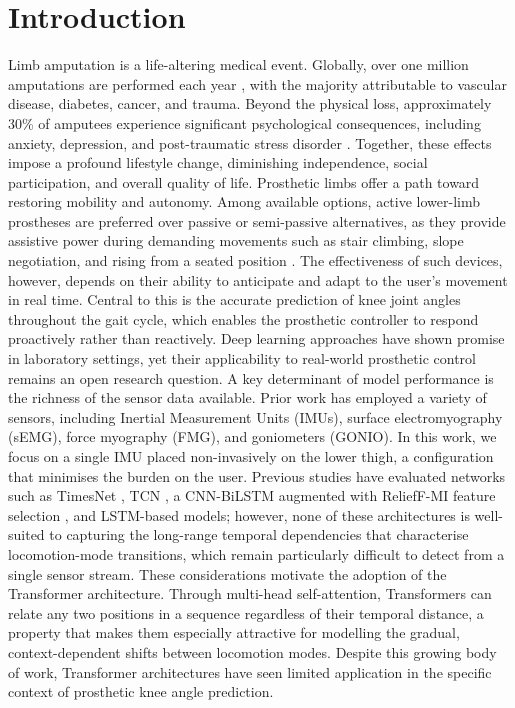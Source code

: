 \section{Introduction}\label{sec:introduction}

Limb amputation is a life-altering medical event. Globally, over one million amputations are performed each year \citep{wen2023globaltamputation}, with the majority attributable to vascular disease, diabetes, cancer, and trauma. Beyond the physical loss, approximately 30\% of amputees experience significant psychological consequences, including anxiety, depression, and post-traumatic stress disorder \citep{rojeDapic2021psychological}. Together, these effects impose a profound lifestyle change, diminishing independence, social participation, and overall quality of life.
Prosthetic limbs offer a path toward restoring mobility and autonomy. Among available options, active lower-limb prostheses are preferred over passive or semi-passive alternatives, as they provide assistive power during demanding movements such as stair climbing, slope negotiation, and rising from a seated position \citep{bhakta2023control}. The effectiveness of such devices, however, depends on their ability to anticipate and adapt to the user's movement in real time. Central to this is the accurate prediction of knee joint angles throughout the gait cycle, which enables the prosthetic controller to respond proactively rather than reactively.
Deep learning approaches have shown promise in laboratory settings, yet their applicability to real-world prosthetic control remains an open research question. A key determinant of model performance is the richness of the sensor data available. Prior work has employed a variety of sensors, including Inertial Measurement Units (IMUs), surface electromyography (sEMG), force myography (FMG), and goniometers (GONIO). In this work, we focus on a single IMU placed non-invasively on the lower thigh, a configuration that minimises the burden on the user. Previous studies have evaluated networks such as TimesNet \citep{PLACEHOLDER}, TCN \citep{PLACEHOLDER}, a CNN-BiLSTM augmented with ReliefF-MI feature selection \citep{PLACEHOLDER}, and LSTM-based models; however, none of these architectures is well-suited to capturing the long-range temporal dependencies that characterise locomotion-mode transitions, which remain particularly difficult to detect from a single sensor stream. These considerations motivate the adoption of the Transformer architecture. Through multi-head self-attention, Transformers can relate any two positions in a sequence regardless of their temporal distance, a property that makes them especially attractive for modelling the gradual, context-dependent shifts between locomotion modes. Despite this growing body of work, Transformer architectures have seen limited application in the specific context of prosthetic knee angle prediction.
